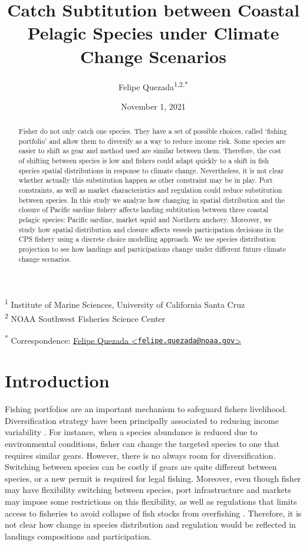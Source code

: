 \documentclass[
]{article}
\title{Catch Subtitution between Coastal Pelagic Species under Climate
Change Scenarios}
\author{Felipe Quezada\textsuperscript{1,2,*}}
\date{November 1, 2021}
\begin{document}
\maketitle
\begin{abstract}
Fisher do not only catch one species. They have a set of possible
choices, called `fishing portfolio' and allow them to diversify as a way
to reduce income risk. Some species are easier to shift as gear and
method used are similar between them. Therefore, the cost of shifting
between species is low and fishers could adapt quickly to a shift in
fish species spatial distributions in response to climate change.
Nevertheless, it is not clear whether actually this substitution happen
as other constraint may be in play. Port constraints, as well as market
characteristics and regulation could reduce substitution between
species. In this study we analyze how changing in spatial distribution
and the closure of Pacific sardine fishery affects landing subtitution
between three coastal pelagic species: Pacific sardine, market squid and
Northern anchovy. Moreover, we study how spatial distribution and
closure affects vessels participation decisions in the CPS fishery using
a discrete choice modelling approach. We use species distribution
projection to see how landings and participations change under different
future climate change scenarios.
\end{abstract}

\textsuperscript{1} Institute of Marine Sciences, University of
California Santa Cruz\\
\textsuperscript{2} NOAA Southwest Fisheries Science Center

\textsuperscript{*} Correspondence:
\href{mailto:felipe.quezada@noaa.gov}{Felipe Quezada
\textless{}\href{mailto:felipe.quezada@noaa.gov}{\nolinkurl{felipe.quezada@noaa.gov}}\textgreater{}}

\hypertarget{introduction}{%
\section{Introduction}\label{introduction}}

Fishing portfolios are an important mechanism to safeguard fishers
livelihood. Diversification strategy have been principally associated to
reducing income variability \citep{kasperski2013}. For instance, when a
species abundance is reduced due to environmental conditions, fisher can
change the targeted species to one that requires similar gears. However,
there is no always room for diversification. Switching between species
can be costly if gears are quite different between species, or a new
permit is required for legal fishing. Moreover, even though fisher may
have flexibility switching between species, port infrastructure and
markets may impose some restrictions on this flexibility, as well as
regulations that limits access to fisheries to avoid collapse of fish
stocks from overfishing \citep{kasperski2013}. Therefore, it is not
clear how change in species distribution and regulation would be
reflected in landings compositions and participation.
\end{document}
